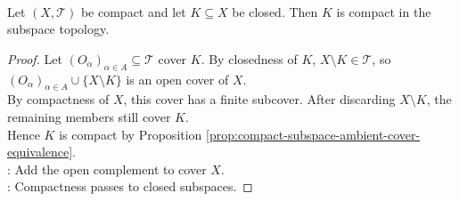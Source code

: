 \begin{proposition} \label{prop:closed-subsets-compact-topological} \\
Let $(X,\mathcal{T})$ be compact and let $K\subseteq X$ be closed. Then $K$ is compact in the subspace topology.
\begin{proof}
Let $(O_\alpha)_{\alpha\in A}\subseteq\mathcal{T}$ cover $K$. By closedness of $K$, $X\setminus K\in\mathcal{T}$, so $(O_\alpha)_{\alpha\in A}\cup\{X\setminus K\}$ is an open cover of $X$.\\
By compactness of $X$, this cover has a finite subcover. After discarding $X\setminus K$, the remaining members still cover $K$.\\
Hence $K$ is compact by Proposition \ref{prop:compact-subspace-ambient-cover-equivalence}.\\
: Add the open complement to cover $X$.\\
: Compactness passes to closed subspaces.
\end{proof}
\end{proposition}

